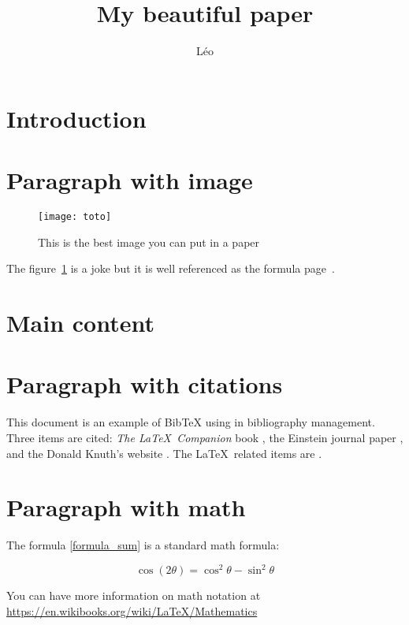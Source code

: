 \documentclass[11pt,twocolumn]{article}
\begin{document}
\title{My beautiful paper}

\author{Léo}

\maketitle

\section{Introduction}

\lipsum[1-1]


\section{Paragraph with image}

\begin{figure}[h] %
\centering
\texttt{[image: toto]}
\caption{This is the best image you can put in a paper}
\label{fig_toto}
\end{figure}

The figure~\ref{fig_toto} is a joke but it is well referenced as the formula page~\pageref{formula_sum}.

\section{Main content}

\lipsum[2-4]

\section{Paragraph with citations}

This document is an example of BibTeX using in bibliography management. Three items 
are cited: \textit{The \LaTeX\ Companion} book \cite{latexcompanion}, the Einstein
journal paper \cite{einstein}, and the Donald Knuth's website \cite{knuthwebsite}. 
The \LaTeX\ related items are \cite{latexcompanion,knuthwebsite}. 


\section{Paragraph with math}

The formula \ref{formula_sum} is a standard math formula:


\begin{equation}
\cos (2\theta) = \cos^2 \theta - \sin^2 \theta
\label{formula_sum}
\end{equation}


You can have more information on math notation at \url{https://en.wikibooks.org/wiki/LaTeX/Mathematics}




\end{document}
